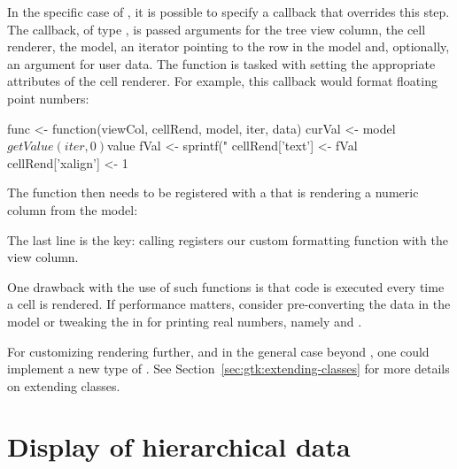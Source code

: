 In the specific case of , it is possible to specify a
callback that overrides this step.  The callback, of type
, is passed arguments for the tree view
column, the cell renderer, the model, an iterator pointing to the row
in the model and, optionally, an argument for user data. The function
is tasked with setting the appropriate attributes of the cell
renderer. For example, this callback would format floating point
numbers:
\begin{Schunk}
\begin{Sinput}
 func <- function(viewCol, cellRend, model, iter, data) {
   curVal <- model$getValue(iter, 0)$value
   fVal <- sprintf("%
   cellRend['text'] <- fVal
   cellRend['xalign'] <- 1
 }
\end{Sinput}
\end{Schunk}
%
The function then needs to be registered with a
 that is rendering a numeric column from the model:
\begin{Schunk}
\end{Schunk}
%
The last line is the key: calling
 registers our custom
formatting function with the view column.

One drawback with the use of such functions is that \R\/ code is
executed every time a cell is rendered. If performance matters,
consider pre-converting the data in the model or tweaking the
 in \R\/ for printing real numbers, namely 
and .

For customizing rendering further, and in the general case beyond
, one could implement a new type of
.  See Section~\ref{sec:gtk:extending-classes}
for more details on extending \GTK\/ classes.


\section{Display of hierarchical data}
\label{sec:RGtk2:mvc:GtkTreeStore}

